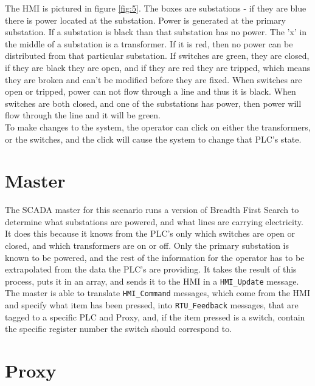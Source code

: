 \documentclass[11pt,a4paper,oldfontcommands]{memoir}
\def\code#1{\texttt{#1}}
\begin{document}
\indent \indent
The HMI is pictured in figure \ref{fig:5}. The boxes are substations - if they are
blue there is power located at the substation. Power is generated at the
primary substation. If a substation is black than that
substation has no power. The 'x' in the middle of a substation is a transformer. 
If it is red, then
no power can be distributed from that particular substation. If switches are green,
they are closed, if they are black they are open, and if they are red they are tripped,
which means they are broken and can't be modified before they are fixed. When switches
are open or tripped, power can not flow through a line and thus it is black. When switches
are both closed, and one of the substations has power, then power will flow
through the line and it will be green. \\

\indent
To make changes to the system, the operator can click on either the transformers,
or the switches, and the click will cause the system to change
that PLC's state. \\


\section{Master}

\indent \indent

The SCADA master for this scenario runs a version of Breadth First Search to determine
what substations are powered, and what lines are carrying electricity. It does this because
it knows from the PLC's only which switches are open or closed, and which transformers are
on or off. Only the primary substation is known to be powered, and the rest of the 
information for the operator has to be extrapolated from the data the PLC's are providing.
It takes the result of this process, puts it in an array, and sends it to the HMI in a 
\code{HMI\_Update} message.
\\

\indent
The master is able to translate \code{HMI\_Command} messages, which come from the HMI and 
specify what item has been pressed, into \code{RTU\_Feedback} messages, that are tagged to 
a specific PLC and Proxy, and, if the item pressed is a switch, contain the specific
register number the switch should correspond to. \\

\section{Proxy}
\end{document}
